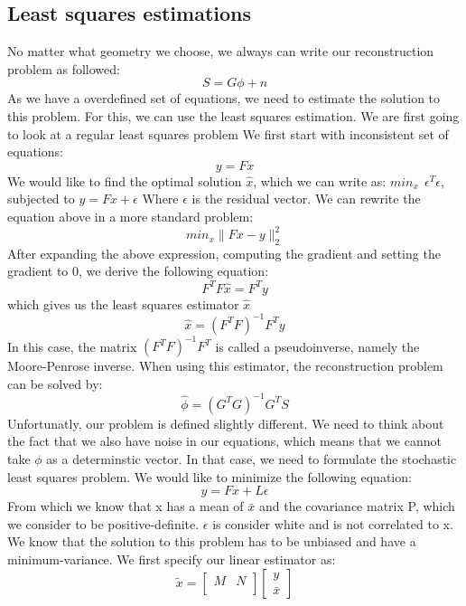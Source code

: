 \documentclass{article}
\begin{document}
\subsection{Least squares estimations}
No matter what geometry we choose, we always can write our reconstruction problem as followed:
$$ S=G\phi +n$$
As we have a overdefined set of equations, we need to estimate the solution to this problem. For this, we can use the least squares estimation. We are first going to look at a regular least squares problem
\newline
\newline
We first start with inconsistent set of equations:
$$ y=Fx $$
We would like to find the optimal solution $\hat{x}$, which we can write as:
\newline
\newline
$ min_x \ \ \epsilon^T \epsilon $, subjected to $ y=Fx + \epsilon$
\newline
\newline
Where $\epsilon$ is the residual vector. We can rewrite the equation above in a more standard problem:
$$ min_x\|Fx-y\|_2^2$$ 
After expanding the above expression, computing the gradient and setting the gradient to 0, we derive the following equation:
$$ F^TF\hat{x}=F^Ty $$
which gives us the least squares estimator $\hat{x}$
$$ \hat{x} = (F^TF)^{-1}F^Ty $$
In this case, the matrix $(F^TF)^{-1}F^T$ is called a pseudoinverse, namely the Moore-Penrose inverse.
When using this estimator, the reconstruction problem can be solved by:
$$ \hat{\phi} = (G^TG)^{-1}G^TS  $$
\newline
\newline
Unfortunatly, our problem is defined slightly different. We need to think about the fact that we also have noise in our equations, which means that we cannot take $\phi$ as a determinstic vector. In that case, we need to formulate the stochastic least squares problem. We would like to minimize the following equation:
$$ y=Fx+L\epsilon$$
From which we know that x has a mean of $\bar{x}$ and the covariance matrix P, which we consider to be positive-definite.
$\epsilon$ is consider white and is not correlated to x. We know that the solution to this problem has to be unbiased and have a minimum-variance. We first specify our linear estimator as:
$$ \tilde{x} = 
\begin{bmatrix}
M & N \\
\end{bmatrix}
\begin{bmatrix}
y \\
\bar{x}
\end{bmatrix}
$$
\end{document}

